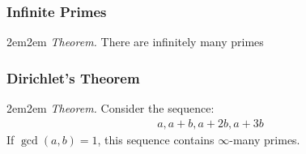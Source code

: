\documentclass[10pt,oneside]{book}
\newcommand{\gspc}{\vspace{0.13cm}} %
\begin{document}
\subsubsection*{Infinite Primes}
\begin{adjustwidth}{2em}{2em}
  \textit{Theorem. }There are infinitely many primes
\end{adjustwidth}\gspc
\subsubsection*{Dirichlet's Theorem}
\begin{adjustwidth}{2em}{2em}
  \textit{Theorem. }Consider the sequence:
  \begin{align*}
    a, a+b, a+2b, a+3b
  \end{align*}
  If $\gcd(a,b)=1$, this sequence contains $\infty$-many primes.
\end{adjustwidth}\gspc
\pagebreak
\subsubsection*{}
\end{document}

